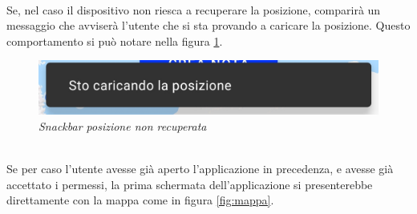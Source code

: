 \\Se, nel caso il dispositivo non riesca a recuperare la posizione, comparirà un messaggio che avviserà l'utente che si sta provando a caricare la posizione. Questo comportamento si può notare nella figura \ref{fig:snackposizione}.
\begin{figure}[!h]
    \centering
	\includegraphics[scale=0.3]{Tesi/images/SnackPosizione}
	\caption{\textit{Snackbar posizione non recuperata}}
	\label{fig:snackposizione}
\end{figure}
\\Se per caso l'utente avesse già aperto l'applicazione in precedenza, e avesse già accettato i permessi, la prima schermata dell'applicazione si presenterebbe direttamente con la mappa come in figura \ref{fig:mappa}.
\pagebreak

